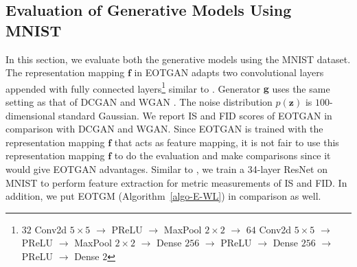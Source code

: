 \subsection{Evaluation of Generative Models Using MNIST}
In this section, we evaluate both the generative models using the MNIST dataset.
The representation mapping $\bm{f}$ in EOTGAN adapts two convolutional layers
appended with fully connected layers\footnote{$32$ Conv2d $5 \times5$
  $\rightarrow$ PReLU $\rightarrow$ MaxPool $2\times2$ $\rightarrow$
  $64$ Conv2d $5\times5$ $\rightarrow$ PReLU $\rightarrow$ MaxPool
  $2\times2$ $\rightarrow$ Dense $256$ $\rightarrow$ PReLU
  $\rightarrow$ Dense $256$ $\rightarrow$ PReLU $\rightarrow$ Dense
  $2$}
similar to \cite{1467314}\cite{1640964}. Generator $\bm{g}$ uses the same
setting as that of DCGAN \cite{2015arXiv151106434R} and WGAN \cite{2017arXiv170107875A}. The noise distribution $p(\bm{z})$ is $100$-dimensional standard Gaussian.
We report IS and FID scores of EOTGAN in comparison with DCGAN and WGAN. Since EOTGAN is trained with the representation mapping $\bm{f}$ that
acts as feature mapping, it is not fair to use this representation mapping $\bm{f}$ to do the
evaluation and make comparisons since it would give EOTGAN
advantages. Similar to \cite{2018arXiv180607755X}, we train a 34-layer
ResNet on MNIST to perform feature extraction for metric measurements
of IS and FID. In addition, we put EOTGM (Algorithm~\ref{algo-E-WL}) in comparison as well.

